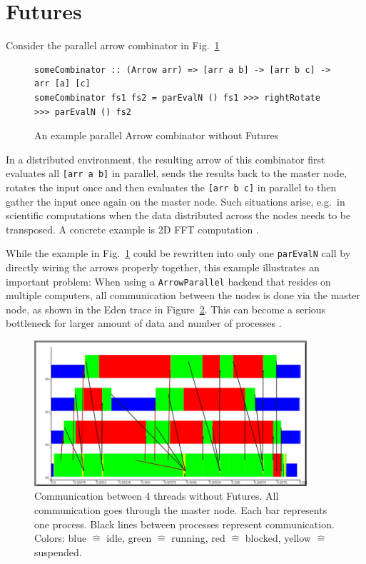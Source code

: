 \documentclass{jfp1}
\renewcommand{\cite}[1]{\citep{#1}}
\newcommand{\inlinecode}[1]{\texttt{#1}}
\DeclareRobustCommand{\hairspn}{\hspace{1pt}\nolinebreak}%
\DeclareRobustCommand{\eg}{{e.\hairspn{}g.~}}
\begin{document}
	\section{Futures} \label{futures}
Consider the parallel arrow combinator in Fig.~\ref{fig:someCombinator}
\begin{figure}[h]
\begin{lstlisting}[frame=htrbl]
someCombinator :: (Arrow arr) => [arr a b] -> [arr b c] -> arr [a] [c]
someCombinator fs1 fs2 = parEvalN () fs1 >>> rightRotate >>> parEvalN () fs2
\end{lstlisting}
\caption{An example parallel Arrow combinator without Futures}
\label{fig:someCombinator}
\end{figure}
In a distributed environment, the resulting arrow of this combinator first evaluates all \inlinecode{[arr a b]} in parallel, sends the results back to the master node, rotates the input once and then evaluates the \inlinecode{[arr b c]} in parallel to then gather the input once again on the master node.
Such situations arise, \eg in scientific computations when the data distributed across the nodes needs to be transposed. A concrete example is 2D FFT computation \cite{Gorlatch,Berthold2009-fft}.

While the example in Fig.~\ref{fig:someCombinator} could be rewritten into only one \inlinecode{parEvalN} call by directly wiring the arrows properly together, this example illustrates an important problem: When using a \inlinecode{ArrowParallel} backend that resides on multiple computers, all communication between the nodes is done via the master node, as shown in the Eden trace in Figure~\ref{fig:withoutFutures}. This can become a serious bottleneck %
for larger amount of data and number of processes \citep[showcases][as, \eg]{Berthold2009-fft}.
\begin{figure}[ht]
	\centering
	\includegraphics[width=0.9\textwidth]{images/withoutFutures}
	\caption[without Futures]{Communication between 4 threads without Futures. All communication goes through the master node. Each bar represents one process. Black lines between processes represent communication. Colors: blue $\hat{=}$ idle, green $\hat{=}$ running, red  $\hat{=}$ blocked, yellow $\hat{=}$ suspended.}
	\label{fig:withoutFutures}
\end{figure}
\end{document}
